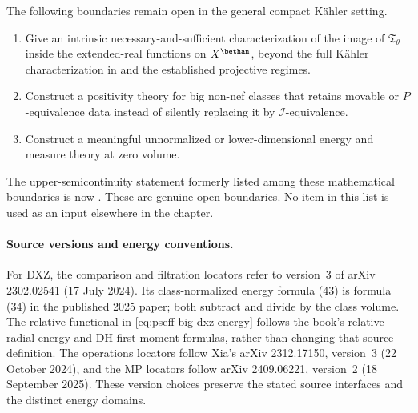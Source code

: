 The following boundaries remain open in the general compact K\"ahler
setting.
\begin{enumerate}
\item Give an intrinsic necessary-and-sufficient characterization of the
      image of $\mathfrak T_\theta$ inside the extended-real functions
      on $X^{\bethan}$, beyond the full K\"ahler characterization in
       and the established projective
      regimes.
\item Construct a positivity theory for big non-nef classes that retains
      movable or $P$-equivalence data instead of silently replacing it
      by $\mathcal I$-equivalence.
\item Construct a meaningful unnormalized or lower-dimensional energy and
      measure theory at zero volume.
\end{enumerate}
The upper-semicontinuity statement formerly listed among these mathematical
boundaries is now .
These are genuine open boundaries.  No item in this list is used as an
input elsewhere in the chapter.


\paragraph{Source versions and energy conventions.}
For DXZ, the comparison and filtration locators refer to version~3 of
arXiv 2302.02541 (17 July 2024). Its class-normalized energy formula (43)
is formula (34) in the published 2025 paper; both subtract and divide by
the class volume. The relative functional in
\eqref{eq:pseff-big-dxz-energy} follows the book's relative radial energy
and DH first-moment formulas, rather than changing that source definition.
The operations locators follow Xia's arXiv 2312.17150, version~3 (22 October 2024),
and the MP locators follow arXiv 2409.06221, version~2 (18 September 2025). These version choices
preserve the stated source interfaces and the distinct energy domains.
